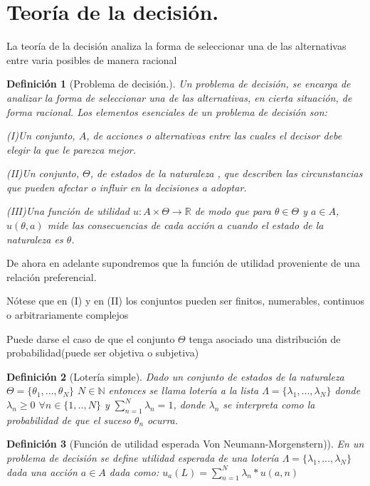 \documentclass[a4paper]{report} %
\newcommand{\R}{\ensuremath{\mathbb{R}}}
\newtheorem{definicion}{Definición}[section]
\begin{document}

\section{Teoría de la decisión.}


La teoría de la decisión analiza la forma de seleccionar una de las alternativas entre varia posibles de manera racional
\begin{definicion}[Problema de decisión.]
Un problema de decisión, se encarga de analizar la forma de seleccionar una de las alternativas, en cierta situación, de forma racional.
Los elementos esenciales de un problema de decisión son:
  
  (I)Un conjunto, $A$, de acciones o alternativas entre las cuales el decisor debe elegir la que le parezca mejor.
  
  (II)Un conjunto, $\Theta$, de estados de la naturaleza , que describen las circunstancias que pueden afectar o influir en la decisiones a adoptar.
  
(III)Una función de utilidad $u:A \times  \Theta \to \R$ de modo que  para $\theta \in \Theta $ y $a \in A$, $u(\theta , a)$ mide las consecuencias de cada acción $a$ cuando el estado de la naturaleza es $\theta$.
\end{definicion}

   
De ahora en adelante supondremos que la función de utilidad proveniente de una relación preferencial.
 
Nótese que en (I) y en (II) los conjuntos pueden ser finitos, numerables, continuos o arbitrariamente complejos

Puede darse el caso de que el conjunto $\Theta$ tenga asociado una distribución de probabilidad(puede ser objetiva o subjetiva)
\begin{definicion}[Lotería simple]
Dado un conjunto de estados de la naturaleza $\Theta =\{ \theta_1,...,\theta_N \} $ $N \in \mathbb{N}$ entonces se llama lotería a la lista $\Lambda =\{ \lambda_1,...,\lambda_N\} $ donde $\lambda_n \ge 0$ $\forall n \in \{ 1,..,N\} $ y $\sum_{n=1}^{N} \lambda_n=1$, donde $\lambda_n$ se interpreta como la probabilidad de que el suceso $\theta_n$ ocurra.
\end{definicion}


\begin{definicion}[Función de utilidad esperada Von Neumann-Morgenstern)]
En un problema de decisión se define utilidad esperada de una lotería $ \Lambda =\{ \lambda_1,...,\lambda_N\} $ dada una acción $a \in A$ dada  como:
$u_a(L)=\sum_{n=1}^{N}\lambda_n*u(a,n)$

\end{definicion}
\end{document}
